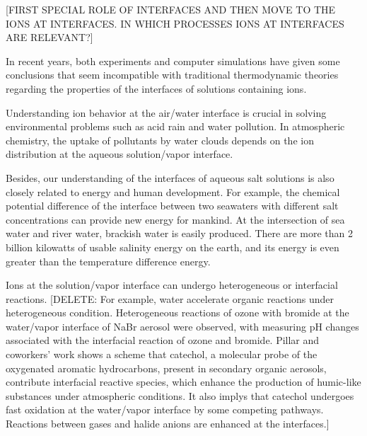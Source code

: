 [FIRST SPECIAL ROLE OF INTERFACES AND THEN MOVE TO THE IONS AT INTERFACES. IN WHICH PROCESSES IONS AT INTERFACES ARE RELEVANT?]



In recent years, both experiments\cite{HuJH95} and computer simulations\cite{Knipping00,PJ01,PJ02} have given some conclusions that seem incompatible with traditional thermodynamic theories regarding the properties of the interfaces of solutions containing ions.


Understanding ion behavior at the air/water interface is crucial in solving environmental problems such as acid
rain and water pollution\cite{Chang06}.
In atmospheric chemistry, the uptake of pollutants by water clouds depends on the ion
distribution at the aqueous solution/vapor interface. 

Besides, our understanding of the interfaces of aqueous salt solutions is also closely related to energy and human development. 
For example, the chemical potential difference of the interface between two seawaters with different salt concentrations can provide new energy for mankind. 
At the intersection of sea water and river water, brackish water is easily produced\cite{Pattle1954,Loeb1976}. 
There are more than 2 billion kilowatts of usable salinity energy on the earth, and its energy is even greater than the temperature difference energy.


Ions at the solution/vapor interface can undergo heterogeneous or interfacial reactions\cite{HuJH95,LiuDF04,Clifford07,Manna13,Pillar2014}.
[DELETE: For example, water accelerate organic reactions under heterogeneous condition\cite{Manna13}. 
Heterogeneous reactions of ozone with bromide at the water/vapor interface of NaBr aerosol were observed, 
with measuring pH changes associated with the interfacial reaction of ozone and bromide\cite{Clifford07}.
Pillar and coworkers'\cite{Pillar2014} work shows a scheme that catechol, a molecular probe of the oxygenated aromatic hydrocarbons, 
present in secondary organic aerosols, contribute interfacial reactive species, which enhance the production 
of humic-like substances under atmospheric conditions. It also implys that catechol undergoes fast oxidation 
at the water/vapor interface by some competing pathways.
Reactions between gases and halide anions are enhanced at the interfaces.\cite{HuJH95,LiuDF04}]

